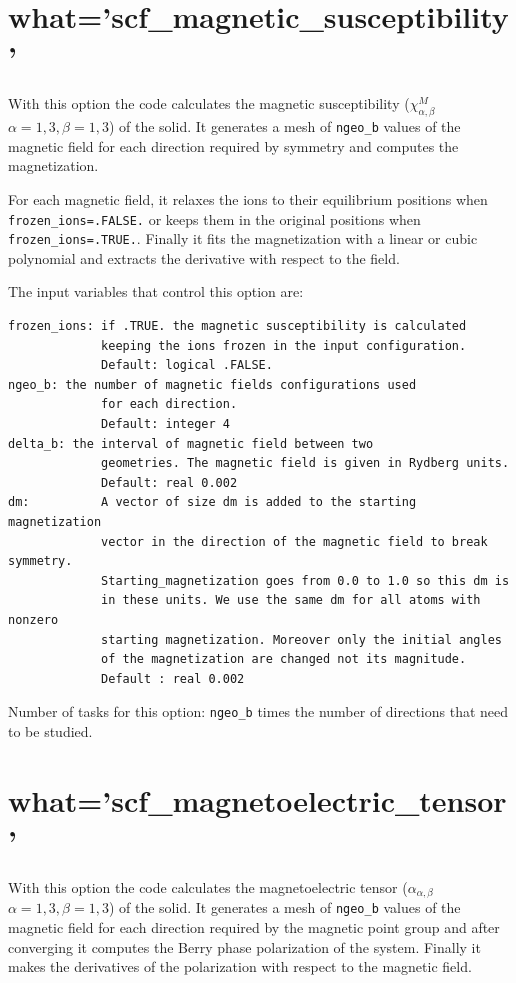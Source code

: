 \documentclass[12pt,a4paper,twoside]{report}
\begin{document}
{\color{coral}\section{what='scf\_magnetic\_susceptibility'}}
\color{black}
With this option the code calculates the magnetic susceptibility 
($\chi^M_{\alpha,\beta}$ $\alpha=1,3,\beta=1,3$) of the solid. 
It generates a mesh of \texttt{ngeo\_b} values of the magnetic field 
for each direction required by symmetry and computes the magnetization. 

For each magnetic field, it relaxes 
the ions to their equilibrium positions when \texttt{frozen\_ions=.FALSE.} 
or keeps them in the original positions when \texttt{frozen\_ions=.TRUE.}. 
Finally it fits the 
magnetization with a linear or cubic polynomial and extracts the 
derivative with respect to the field.

The input variables that control this option are:
\begin{verbatim}
frozen_ions: if .TRUE. the magnetic susceptibility is calculated 
             keeping the ions frozen in the input configuration. 
             Default: logical .FALSE.
ngeo_b: the number of magnetic fields configurations used 
             for each direction. 
             Default: integer 4
delta_b: the interval of magnetic field between two 
             geometries. The magnetic field is given in Rydberg units. 
             Default: real 0.002
dm:          A vector of size dm is added to the starting magnetization
             vector in the direction of the magnetic field to break symmetry.
             Starting_magnetization goes from 0.0 to 1.0 so this dm is
             in these units. We use the same dm for all atoms with nonzero
             starting magnetization. Moreover only the initial angles 
             of the magnetization are changed not its magnitude.
             Default : real 0.002
\end{verbatim}
Number of tasks for this option: \texttt{ngeo\_b} times the number of
directions that need to be studied. 
%
\newpage

{\color{coral}\section{what='scf\_magnetoelectric\_tensor'}}
\color{black}
With this option the code calculates the magnetoelectric tensor
($\alpha_{\alpha,\beta}$ $\alpha=1,3,\beta=1,3$) of the solid. 
It generates a mesh of \texttt{ngeo\_b} values of the magnetic field 
for each direction required by the magnetic point group and after 
converging it computes the Berry phase polarization of the system. 
Finally it makes the derivatives of the polarization with respect 
to the magnetic field.
\end{document}
